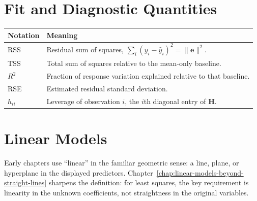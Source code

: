 {\section*{Fit and Diagnostic Quantities}

\begin{center}
\begin{tabular}{p{}p{}}
\toprule
\textbf{Notation} & \textbf{Meaning} \\
\midrule
RSS & Residual sum of squares, $\sum_i (y_i-\widehat{y}_i)^2=\|\mathbf{e}\|^2$. \\
TSS & Total sum of squares relative to the mean-only baseline. \\
$R^2$ & Fraction of response variation explained relative to that baseline. \\
RSE & Estimated residual standard deviation. \\
$h_{ii}$ & Leverage of observation $i$, the $i$th diagonal entry of $\mathbf{H}$. \\
\bottomrule
\end{tabular}
\end{center}

\section*{Linear Models}

Early chapters use ``linear'' in the familiar geometric sense: a line, plane, or hyperplane in the displayed predictors.  Chapter~\ref{chap:linear-models-beyond-straight-lines} sharpens the definition: for least squares, the key requirement is linearity in the unknown coefficients, not straightness in the original variables.
}
